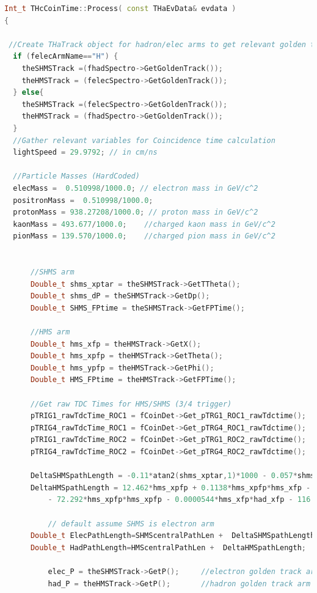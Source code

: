 \documentclass[14pt]{article}
\begin{document}
\begin{lstlisting}[language=C++, caption={THcCoinTime.cxx, The Process() Method}] 
Int_t THcCoinTime::Process( const THaEvData& evdata )
{
  
 //Create THaTrack object for hadron/elec arms to get relevant golden track quantities
  if (felecArmName=="H") {
    theSHMSTrack =(fhadSpectro->GetGoldenTrack());     
    theHMSTrack = (felecSpectro->GetGoldenTrack());
  } else{
    theSHMSTrack =(felecSpectro->GetGoldenTrack()); 
    theHMSTrack = (fhadSpectro->GetGoldenTrack());
  }
  //Gather relevant variables for Coincidence time calculation
  lightSpeed = 29.9792; // in cm/ns

  //Particle Masses (HardCoded)
  elecMass =  0.510998/1000.0; // electron mass in GeV/c^2
  positronMass =  0.510998/1000.0;
  protonMass = 938.27208/1000.0; // proton mass in GeV/c^2	
  kaonMass = 493.677/1000.0;    //charged kaon mass in GeV/c^2
  pionMass = 139.570/1000.0;    //charged pion mass in GeV/c^2

  
      //SHMS arm
      Double_t shms_xptar = theSHMSTrack->GetTTheta();     
      Double_t shms_dP = theSHMSTrack->GetDp();            
      Double_t SHMS_FPtime = theSHMSTrack->GetFPTime();    
      
      //HMS arm
      Double_t hms_xfp = theHMSTrack->GetX();           
      Double_t hms_xpfp = theHMSTrack->GetTheta();      
      Double_t hms_ypfp = theHMSTrack->GetPhi();        
      Double_t HMS_FPtime = theHMSTrack->GetFPTime();    
      
      //Get raw TDC Times for HMS/SHMS (3/4 trigger)
      pTRIG1_rawTdcTime_ROC1 = fCoinDet->Get_pTRG1_ROC1_rawTdctime(); 
      pTRIG4_rawTdcTime_ROC1 = fCoinDet->Get_pTRG4_ROC1_rawTdctime();
      pTRIG1_rawTdcTime_ROC2 = fCoinDet->Get_pTRG1_ROC2_rawTdctime();
      pTRIG4_rawTdcTime_ROC2 = fCoinDet->Get_pTRG4_ROC2_rawTdctime();

	  DeltaSHMSpathLength = -0.11*atan2(shms_xptar,1)*1000 - 0.057*shms_dP;
	  DeltaHMSpathLength = 12.462*hms_xpfp + 0.1138*hms_xpfp*hms_xfp - 0.0154*hms_xfp
          - 72.292*hms_xpfp*hms_xpfp - 0.0000544*hms_xfp*had_xfp - 116.52*hms_ypfp*hms_ypfp;

          // default assume SHMS is electron arm
	  Double_t ElecPathLength=SHMScentralPathLen +  DeltaSHMSpathLength;
	  Double_t HadPathLength=HMScentralPathLen +  DeltaHMSpathLength;

          elec_P = theSHMSTrack->GetP();     //electron golden track arm momentum
          had_P = theHMSTrack->GetP();       //hadron golden track arm momentum


\end{lstlisting}
\end{document}
